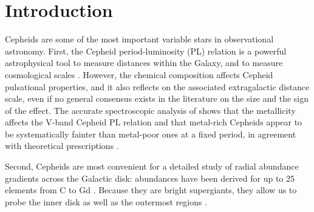 \documentclass{aa}
\begin{document}
%



\section{Introduction}
Cepheids are some of the most  important variable stars 
in observational astronomy. 
First, the Cepheid period-luminosity (PL) relation 
\citep{1908AnHar..60...87L, 1912HarCi.173....1L}  is a powerful 
astrophysical tool to  measure distances within the 
Galaxy, and to measure cosmological scales \citep{2016ApJ...826...56R}.  
However, the chemical composition affects Cepheid pulsational properties, 
and it also reflects on the associated 
extragalactic distance scale,  even if no general 
consensus exists in the literature on the size and the sign of the effect. 
The accurate spectroscopic 
analysis of  \cite{2005A&A...429L..37R, 2008A&A...488..731R} 
shows that the metallicity affects the V-band 
Cepheid PL relation and that  metal-rich Cepheids appear to be 
systematically fainter than metal-poor ones 
at a fixed period, in agreement with theoretical prescriptions 
\citep{1999ApJ...512..711B, 2005ApJ...632..590M}.

Second, Cepheids are most convenient for a detailed study of radial
abundance gradients across the Galactic disk: abundances have been
derived for up to 25 elements from C to Gd \citep{2002A&A...381...32A,
2013A&A...558A..31L, 2015A&A...580A..17G, 2016A&A...586A.125D}.
Because they are bright supergiants, they allow us to probe the inner
disk \citep{2013A&A...554A.132G, 2015MNRAS.449.4071M, 2016MNRAS.461.4256A}
as well as the outermost regions \citep{2004A&A...413..159A, 2008A&A...490..613L, 2011AJ....142...51L}.

\end{document}
